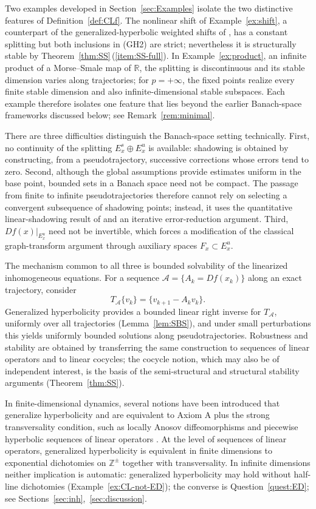 \documentclass[12pt]{article}
\newcommand{\Zz}{\mathbb{Z}}
\newcommand{\Rr}{\mathbb{R}}
\theoremstyle{definition}
\begin{document}
Two examples developed in Section~\ref{sec:Examples} isolate the two
distinctive features of Definition~\ref{def:CLf}. The nonlinear shift of
Example~\ref{ex:shift}, a counterpart of the generalized-hyperbolic weighted shifts of \cite{Puj18,Puj21}, has a constant splitting but both inclusions in {\rm(GH2)} are strict; nevertheless it is structurally stable by Theorem~\ref{thm:SS}\,(\ref{item:SS-full}). 
In Example~\ref{ex:product}, an infinite product of a Morse--Smale map of $\Rr$, the splitting is discontinuous and its stable dimension varies along trajectories; for $p=+\infty$, the fixed points realize every finite stable dimension and also infinite-dimensional stable subspaces.
Each example therefore isolates one feature that lies beyond the earlier Banach-space frameworks discussed below; see Remark~\ref{rem:minimal}.

There are three difficulties distinguish the Banach-space setting technically.
First, no continuity of the splitting $E^s_x\oplus E^u_x$ is available: shadowing is obtained by constructing, from a pseudotrajectory, successive corrections whose errors tend to zero.
Second, although the global assumptions provide estimates uniform in the base point, bounded sets in a Banach space need not be compact. The passage from finite to infinite pseudotrajectories therefore cannot rely on selecting a convergent subsequence of shadowing points; instead, it uses the quantitative linear-shadowing result of \cite{NilsonPeris} and an iterative error-reduction argument.
Third, $Df(x)|_{E^u_x}$ need not be invertible, which forces a modification of the classical graph-transform argument through auxiliary spaces $F_x\subset E^u_x$.

The mechanism common to all three is bounded solvability of the linearized inhomogeneous equations.
For a sequence $\mathcal A=\{A_k=Df(x_k)\}$ along an exact trajectory, consider
$$
T_{\mathcal A}\{v_k\}=\{v_{k+1}-A_kv_k\}.
$$
Generalized hyperbolicity provides a bounded linear right inverse for $T_{\mathcal A}$, uniformly over all trajectories (Lemma~\ref{lem:SBS}), and under small perturbations this yields uniformly bounded solutions along pseudotrajectories.
Robustness and stability are obtained by transferring the same construction to sequences of linear operators and to linear cocycles; the cocycle notion, which may also be of independent interest, is the basis of the semi-structural and structural stability arguments (Theorem~\ref{thm:SS}).

In finite-dimensional dynamics, several notions have been introduced that generalize hyperbolicity and are equivalent to Axiom A plus the strong transversality condition, such as locally Anosov diffeomorphisms \cite{Rob71} and piecewise hyperbolic sequences of linear operators \cite{Pli77, Pli80}. 
At the level of sequences of linear operators, generalized hyperbolicity
is equivalent in finite dimensions to exponential dichotomies on
$\Zz^\pm$ together with transversality. In infinite dimensions neither
implication is automatic: generalized hyperbolicity may hold without
half-line dichotomies (Example~\ref{ex:CL-not-ED}); the
converse is Question~\ref{quest:ED}; see Sections~\ref{sec:inh},~\ref{sec:discussion}.
\end{document}
